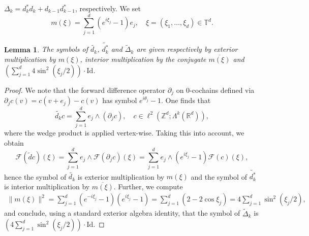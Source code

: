 \documentclass[11pt,reqno]{amsart}
\numberwithin{equation}{section}
\newtheorem{lemma}[theorem]{Lemma}
\theoremstyle{remark}
\theoremstyle{rmdefinition}
\begin{document}
$\Delta_k=d_k^{*} d_k + d_{k-1} d^*_{k-1}$, respectively. We set
$$ m(\xi) = \sum_{j=1}^d (e^{i\xi_j} - 1) e_j, \quad \xi=(\xi_1,\ldots, \xi_d ) \in \mathbb{T}^d.$$
\begin{lemma}\label{symofsoop}
The symbols of $\tilde{d_k}$, $\tilde{d^*_k}$ and $\tilde{\Delta}_k$ are given respectively by exterior multiplication by $m(\xi)$, interior multiplication by the conjugate $\overline{m(\xi)}$ and $\left( \sum_{j=1}^d 4\sin^2(\xi_j/2) \right) \cdot \text{Id}$.
\end{lemma}
\begin{proof}
We note that the forward difference operator $\partial_j$ on 0-cochains defined via $\partial_j c(v) = c(v+e_j) - c(v)$ has symbol $e^{i\theta_j} - 1$. One finds that
$$ \tilde{d_k}c = \sum_{j=1}^d e_j \wedge (\partial_j c),
 \quad c \in  \ell^2(\mathbb{Z}^d;\Lambda^k(\mathbb{R}^d)),$$
 where the wedge product is applied vertex-wise. Taking this into account, we obtain
$$ \mathcal{F}(\tilde{d}c)(\xi) = \sum_{j=1}^d e_j \wedge \mathcal{F}(\partial_j c)(\xi) = \sum_{j=1}^d e_j \wedge  (e^{i\xi_j} - 1) \mathcal{F}(c)(\xi),$$
hence the symbol of $\tilde{d_k}$ is exterior multiplication by $m(\xi)$ and the symbol of $\tilde{d^*_k}$ is interior multiplication by  $\overline{m(\xi)}$. Further, we compute
\begin{multline*}
\|m(\xi)\|^2  = \sum_{j=1}^d (e^{-i\xi_j} - 1)(e^{i\xi_j} - 1) 
= \sum_{j=1}^d (2 - 2\cos\xi_j) = 4\sum_{j=1}^d \sin^2(\xi_j/2), 
\end{multline*}
and conclude, using a standard exterior algebra identity, that the symbol of $\tilde{\Delta}_k$ is $\left( 4\sum_{j=1}^d\sin^2(\xi_j/2) \right) \cdot \text{Id}$.
\end{proof}
\end{document}
